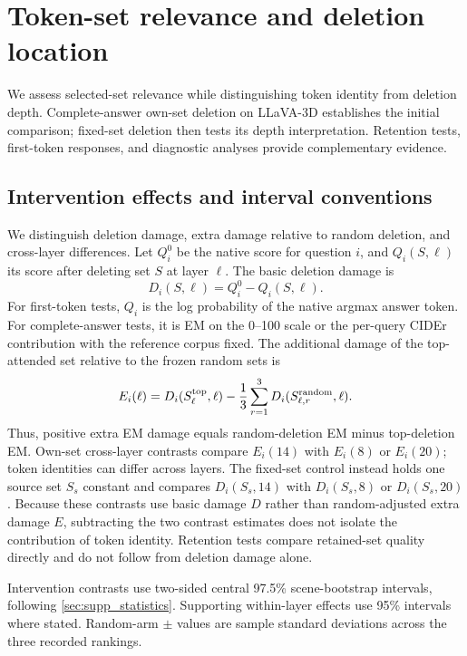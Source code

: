 \section{Token-set relevance and deletion location}
\label{sec:supp_functional}
We assess selected-set relevance while distinguishing token identity from deletion depth. Complete-answer own-set deletion on LLaVA-3D establishes the initial comparison; fixed-set deletion then tests its depth interpretation. Retention tests, first-token responses, and diagnostic analyses provide complementary evidence.


\subsection{Intervention effects and interval conventions}
\label{sec:supp_damage}

We distinguish deletion damage, extra damage relative to random deletion, and cross-layer differences. Let $Q_i^0$ be the native score for question $i$, and $Q_i(S,\ell)$ its score after deleting set $S$ at layer $\ell$. The basic deletion damage is
\begin{equation}
D_i(S,\ell)=Q_i^0-Q_i(S,\ell).
\end{equation}
For first-token tests, $Q_i$ is the log probability of the native argmax answer token. For complete-answer tests, it is EM on the 0--100 scale or the per-query CIDEr contribution with the reference corpus fixed. The additional damage of the top-attended set relative to the frozen random sets is
\begin{equation}
E_i(\ell)=D_i(S_{\ell}^{\rm top},\ell)
-\frac{1}{3}\sum_{r=1}^{3}D_i(S_{\ell,r}^{\rm random},\ell).
\end{equation}
Thus, positive extra EM damage equals random-deletion EM minus top-deletion EM. Own-set cross-layer contrasts compare $E_i(14)$ with $E_i(8)$ or $E_i(20)$; token identities can differ across layers. The fixed-set control instead holds one source set $S_s$ constant and compares $D_i(S_s,14)$ with $D_i(S_s,8)$ or $D_i(S_s,20)$. Because these contrasts use basic damage $D$ rather than random-adjusted extra damage $E$, subtracting the two contrast estimates does not isolate the contribution of token identity. Retention tests compare retained-set quality directly and do not follow from deletion damage alone.

Intervention contrasts use two-sided central 97.5\% scene-bootstrap intervals, following \cref{sec:supp_statistics}. Supporting within-layer effects use 95\% intervals where stated. Random-arm $\pm$ values are sample standard deviations across the three recorded rankings.

